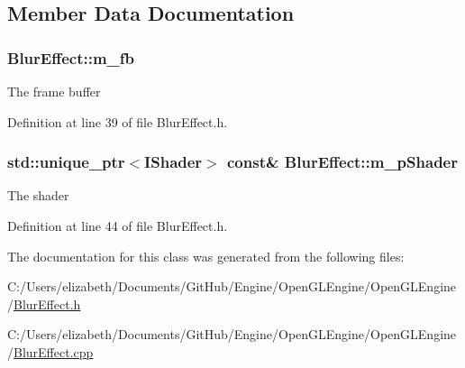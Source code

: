 \subsection{Member Data Documentation}
\subsubsection[{\texorpdfstring{m\+\_\+fb}{m_fb}}]{ Blur\+Effect\+::m\+\_\+fb\hspace{0.3cm}{\ttfamily [private]}}\hypertarget{class_blur_effect_a73b9441bb187c47b83d99e2a67a421e5}{}\label{class_blur_effect_a73b9441bb187c47b83d99e2a67a421e5}


The frame buffer 



Definition at line 39 of file Blur\+Effect.\+h.

\subsubsection[{\texorpdfstring{m\+\_\+p\+Shader}{m_pShader}}]{\setlength{\rightskip}{0pt plus 5cm}std\+::unique\+\_\+ptr$<${\bf I\+Shader}$>$ const\& Blur\+Effect\+::m\+\_\+p\+Shader\hspace{0.3cm}{\ttfamily [private]}}\hypertarget{class_blur_effect_a29dbaae4fbb90818efcabf0d02dbba01}{}\label{class_blur_effect_a29dbaae4fbb90818efcabf0d02dbba01}


The shader 



Definition at line 44 of file Blur\+Effect.\+h.



The documentation for this class was generated from the following files\+:\begin{DoxyCompactItemize}
\item 
C\+:/\+Users/elizabeth/\+Documents/\+Git\+Hub/\+Engine/\+Open\+G\+L\+Engine/\+Open\+G\+L\+Engine/\hyperlink{_blur_effect_8h}{Blur\+Effect.\+h}\item 
C\+:/\+Users/elizabeth/\+Documents/\+Git\+Hub/\+Engine/\+Open\+G\+L\+Engine/\+Open\+G\+L\+Engine/\hyperlink{_blur_effect_8cpp}{Blur\+Effect.\+cpp}\end{DoxyCompactItemize}

